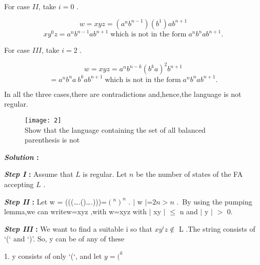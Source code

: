 \documentclass[10pt,a4paper]{book}
\begin{document}
For case $II$, take $i = 0$ .

$$ w=xyz=(a^{n} b^{n-1})(b^{1}) ab^{n+1} $$
$$ xy^{0}z = a^{n} b^{n-1} ab^{n+1}\; \textrm{which is not in the form}\; a^{n} b^{n} ab^{n+1} . $$

For case $III$, take $i = 2$ .

$$ w=xyz=a^{n} b^{n-k}(b^{k}a)^{2} b^{n+1} $$
$$ = a^{n} b^{n}a\: b^{k} ab^{n+1}\; \textrm{which is not in the form}\; a^{n} b^{n} ab^{n+1} . $$

In all the three cases,there are contradictions and,hence,the language is not regular.

\begin{flushleft}
\begin{figure}[h]
  \texttt{[image: 2]}\\Show that the language containing the set of all balanced parenthesis is not
\end{figure}
\end{flushleft}

\begin{flushleft}
  \textbf{\emph{Solution} :}

\textbf{\emph{Step I} :} Assume that $L$ is regular. Let $n$ be the number of states of the FA accepting $L$ .

\textbf{\emph{Step II} :} Let w = (((….()….)))=$(^n)^{n}$ . $|$ w $|$=$2n > n$ .\,\,\,\textrm{By using the pumping lemma,we can write}w=xyz ,with w=xyz with $|$ xy $|$ $\leq$ n and $|$ y $|$ $>$ 0.

\textbf{\emph{Step III} :} We want to find a suitable i so that $xy^{i}z \notin$ L .The string consists of ‘(‘ and ‘)’. So, y can be of any of these

\end{flushleft}

1. y consists of only ‘(‘, and let $y =(^{k}$
\end{document}
